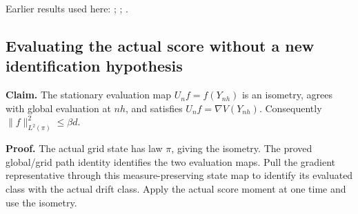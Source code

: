 \documentclass[11pt,a4paper]{report}
\begin{document}
Earlier results used here: \cite[Section~3.26.10]{LangevinLean2026ULASC}; \cite[Section~3.26.3]{LangevinLean2026ULASC}; \cite[Section~3.27.7]{LangevinLean2026ULASC}.
\subsection{\texorpdfstring{Evaluating the actual score without a new identification hypothesis}{Evaluating the actual score without a new identification hypothesis}}
\label{report-step-WassersteinMixing-ActualScoreObservable-lean-2}


\textbf{Claim.} The stationary evaluation map \(U_n f=f(Y_{nh})\) is an isometry, agrees with global evaluation at \(nh\), and satisfies \(U_nf=\nabla V(Y_{nh})\). Consequently \(\|f\|_{L^2(\pi)}^2\le\beta d\).



\textbf{Proof.} The actual grid state has law \(\pi\), giving the isometry. The proved global/\allowbreak{}grid path identity identifies the two evaluation maps. Pull the gradient representative through this measure-preserving state map to identify its evaluated class with the actual drift class. Apply the actual score moment at one time and use the isometry.
\end{document}
